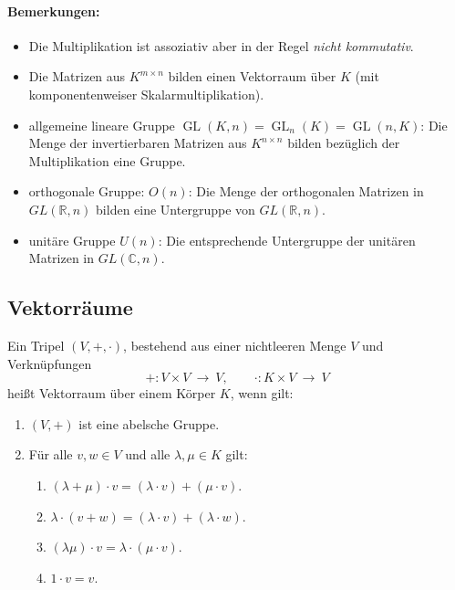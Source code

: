 \documentclass[a4paper,12pt,DIV15]{scrartcl}
\begin{document}
\paragraph{Bemerkungen:}
\begin{itemize}
\item Die Multiplikation ist assoziativ aber in der Regel \textsl{nicht kommutativ}. 
\item Die Matrizen aus $K^{m \times n}$ bilden einen Vektorraum über
$K$ (mit komponentenweiser Skalarmultiplikation).
\item {\color{red} allgemeine
lineare Gruppe} $\operatorname{GL}(K,n) = \operatorname{GL}_n(K) = \operatorname{GL}(n,K)$: 
Die Menge der invertierbaren Matrizen aus $K^{n \times n}$ bilden bezüglich der Multiplikation eine Gruppe.
\item {\color{red} orthogonale Gruppe}: $O(n)$: Die Menge der orthogonalen Matrizen in $GL(\mathbb{R},n)$ bilden
 eine Untergruppe von  $GL(\mathbb{R},n)$. 
\item  {\color{red} unitäre Gruppe} $U(n)$: Die entsprechende Untergruppe der unitären Matrizen in $GL(\mathbb{C},n)$.
\end{itemize}


\subsection{Vektorräume}
\begin{defn}[Vektorraum]
Ein Tripel $(V,+,\cdot)$, bestehend aus einer nichtleeren Menge $V$
und Verknüpfungen
\[ +:V \times V \ \rightarrow \ V, \qquad \cdot:K\times V \ \rightarrow \ V\]
heißt {\color{red} Vektorraum} über einem Körper
$K$, wenn gilt:
\begin{enumerate}
\item $(V,+)$ ist eine abelsche Gruppe.
\item Für alle $v,w \in V$ und alle $\lambda, \mu \in K$ gilt:
\begin{enumerate}
 \item $(\lambda + \mu) \cdot v  =(\lambda \cdot v) + ( \mu \cdot v)$.
\item $\lambda \cdot (v + w )  = ( \lambda \cdot v) + ( \lambda \cdot w)$.
\item $(\lambda \mu) \cdot v = \lambda \cdot (\mu \cdot v)$.
\item $1 \cdot v = v$.
\end{enumerate}
\end{enumerate}
\end{defn}
\end{document}
